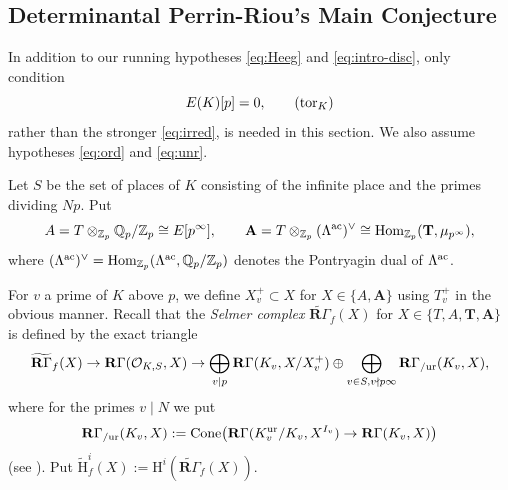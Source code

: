 \documentclass[10pt,reqno]{amsart}
\numberwithin{equation}{section}
\theoremstyle{plain}
\theoremstyle{definition}
\theoremstyle{definition}
\theoremstyle{plain}
\theoremstyle{plain}
\theoremstyle{plain}
\theoremstyle{plain}
\theoremstyle{plain}
\theoremstyle{plain}
\newcommand{\Tac}{\mathbf{T}}
\newcommand{\Z}{\mathbb{Z}}
\newcommand{\Q}{\mathbb{Q}}
\newcommand{\rH}{\mathrm{H}}
\begin{document}
\subsection{Determinantal Perrin-Riou's Main Conjecture}\label{subsec:IMC-heegner}

In addition to our running hypotheses \eqref{eq:Heeg} and \eqref{eq:intro-disc},  only condition  
\begin{equation}\label{eq:K-tor}
E(K)[p]=0,\tag{${\rm tor}_K$}
\end{equation}
rather than the stronger \eqref{eq:irred}, 
is needed in this section. We also assume hypotheses \eqref{eq:ord} and \eqref{eq:unr}. 

Let $S$ be the set of places of $K$ consisting of the infinite place and the primes dividing $Np$.  
%
%
Put
\[
A=T\otimes_{\Z_p}\Q_p/\Z_p\cong E[p^\infty],\quad\quad
\mathbf{A}=T\otimes_{\Z_p}(\Lambda^{\rm ac})^\vee\cong{\rm Hom}_{\Z_p}(\mathbf{T},\mu_{p^\infty}),
\]
where $(\Lambda^{\rm ac})^\vee={\rm Hom}_{\Z_p}(\Lambda^{\rm ac},\Q_p/\Z_p)$ denotes the Pontryagin dual of $\Lambda^{\rm ac}$. 

For $v$ a prime of $K$ above $p$, we define $X_v^+\subset X$ for $X\in\{A,\mathbf{A}\}$ using $T_v^+$ in the obvious manner. Recall that the \emph{Selmer complex}  $\widetilde{\mathbf{R}\Gamma}_f(X)$ for $X\in\{T,A,\Tac,\mathbf{A}\}$ is defined by the exact triangle
\begin{equation}\label{eq:exact-tri}
\widetilde{\mathbf{R}\Gamma}_f(X)\rightarrow\mathbf{R}\Gamma(\mathcal{O}_{K,S},X)\rightarrow\bigoplus_{v\mid p}\mathbf{R}\Gamma(K_v,X/X_v^+)\oplus\bigoplus_{v\in S, v\nmid p\infty}\mathbf{R}\Gamma_{/{\rm ur}}(K_v,X),
\end{equation}
where for the primes $v\mid N$ we put
\begin{align*}
\mathbf{R}\Gamma_{/{\rm ur}}(K_v,X):={\rm Cone}\bigl(\mathbf{R}\Gamma(K_v^{\rm ur}/K_v,X^{I_v})\rightarrow\mathbf{R}\Gamma(K_v,X)\bigr)
\end{align*}
(see \cite[(6.1.3.2), (8.8.5)]{nekovar-310}). Put $\widetilde{\rH}_f^i(X):=\rH^i(\widetilde{\mathbf{R}\Gamma}_f(X))$. 
\end{document}
